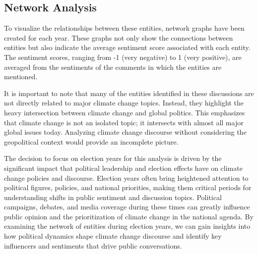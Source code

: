 \subsection{Network Analysis}
To visualize the relationships between these entities, network graphs have been created for each year. These graphs not only show the connections between entities but also indicate the average sentiment score associated with each entity. The sentiment scores, ranging from -1 (very negative) to 1 (very positive), are averaged from the sentiments of the comments in which the entities are mentioned.

It is important to note that many of the entities identified in these discussions are not directly related to major climate change topics. Instead, they highlight the heavy intersection between climate change and global politics. This emphasizes that climate change is not an isolated topic; it intersects with almost all major global issues today. Analyzing climate change discourse without considering the geopolitical context would provide an incomplete picture.

The decision to focus on election years for this analysis is driven by the significant impact that political leadership and election effects have on climate change policies and discourse. Election years often bring heightened attention to political figures, policies, and national priorities, making them critical periods for understanding shifts in public sentiment and discussion topics. Political campaigns, debates, and media coverage during these times can greatly influence public opinion and the prioritization of climate change in the national agenda. By examining the network of entities during election years, we can gain insights into how political dynamics shape climate change discourse and identify key influencers and sentiments that drive public conversations.

